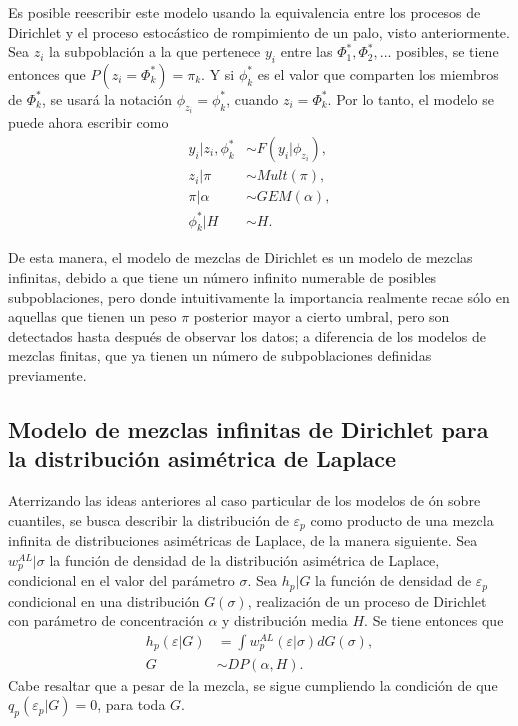 Es posible reescribir este modelo usando la equivalencia entre los procesos de Dirichlet y el proceso estoc\'astico de rompimiento de un palo, visto anteriormente. Sea $z_i$ la subpoblaci\'on a la que pertenece $y_i$ entre las $\Phi_1^*,\Phi_2^*,...$ posibles, se tiene entonces que $P(z_i = \Phi_k^*) = \pi_k$. Y si $\phi_k^*$ es el valor que comparten los miembros de $\Phi_k^*$, se usar\'a la notaci\'on $\phi_{z_i} = \phi_k^*$, cuando $z_i = \Phi_k^*$. Por lo tanto, el modelo se puede ahora escribir como
\begin{equation*}
\begin{aligned}
   y_i | z_i, \phi_k^* &\sim F(y_i | \phi_{z_i}), \\
   z_i | \pi &\sim Mult(\pi), \\
   \pi | \alpha &\sim GEM(\alpha), \\
   \phi_k^* | H &\sim H.
\end{aligned}
\end{equation*}

De esta manera, el modelo de mezclas de Dirichlet es un modelo de mezclas infinitas, debido a que tiene un n\'umero infinito numerable de posibles subpoblaciones, pero donde intuitivamente la importancia realmente recae s\'olo en aquellas que tienen un peso $\pi$ posterior mayor a cierto umbral, pero son detectados hasta despu\'es de observar los datos; a diferencia de los modelos de mezclas finitas, que ya tienen un n\'umero de subpoblaciones definidas previamente.

\subsection{Modelo de mezclas infinitas de Dirichlet para la distribuci\'on asim\'etrica de Laplace}

Aterrizando las ideas anteriores al caso particular de los modelos de \regresi\'on sobre cuantiles, se busca describir la distribuci\'on de $\varepsilon_p$ como producto de una mezcla infinita de distribuciones asim\'etricas de Laplace, de la manera siguiente. Sea $w_p^{AL} | \sigma$ la funci\'on de densidad de la distribuci\'on asim\'etrica de Laplace, condicional en el valor del par\'ametro $\sigma$. Sea $h_p|G$ la funci\'on de densidad de $\varepsilon_p$ condicional en una distribuci\'on $G(\sigma)$, realizaci\'on de un proceso de Dirichlet con par\'ametro de concentraci\'on $\alpha$ y distribuci\'on media $H$. Se tiene entonces que
\begin{equation*}
\begin{aligned}
    h_p(\varepsilon|G) &= \int w_p^{AL}(\varepsilon|\sigma)dG(\sigma), \\
    G &\sim DP(\alpha,H).
\end{aligned}
\end{equation*}
Cabe resaltar que a pesar de la mezcla, se sigue cumpliendo la condici\'on de que $q_p(\varepsilon_p|G) = 0$, para toda $G$.

